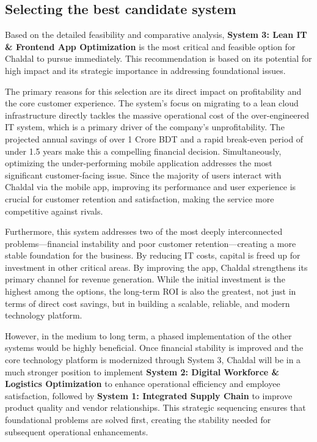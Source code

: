 \documentclass[12pt,a4paper]{article}
\begin{document}
\subsection{Selecting the best candidate system}
Based on the detailed feasibility and comparative analysis, \textbf{System 3: Lean IT \& Frontend App Optimization} is the most critical and feasible option for Chaldal to pursue immediately. This recommendation is based on its potential for high impact and its strategic importance in addressing foundational issues.

The primary reasons for this selection are its direct impact on profitability and the core customer experience. The system's focus on migrating to a lean cloud infrastructure directly tackles the massive operational cost of the over-engineered IT system, which is a primary driver of the company's unprofitability. The projected annual savings of over 1 Crore BDT and a rapid break-even period of under 1.5 years make this a compelling financial decision. Simultaneously, optimizing the under-performing mobile application addresses the most significant customer-facing issue. Since the majority of users interact with Chaldal via the mobile app, improving its performance and user experience is crucial for customer retention and satisfaction, making the service more competitive against rivals.

Furthermore, this system addresses two of the most deeply interconnected problems—financial instability and poor customer retention—creating a more stable foundation for the business. By reducing IT costs, capital is freed up for investment in other critical areas. By improving the app, Chaldal strengthens its primary channel for revenue generation. While the initial investment is the highest among the options, the long-term ROI is also the greatest, not just in terms of direct cost savings, but in building a scalable, reliable, and modern technology platform.

However, in the medium to long term, a phased implementation of the other systems would be highly beneficial. Once financial stability is improved and the core technology platform is modernized through System 3, Chaldal will be in a much stronger position to implement \textbf{System 2: Digital Workforce \& Logistics Optimization} to enhance operational efficiency and employee satisfaction, followed by \textbf{System 1: Integrated Supply Chain} to improve product quality and vendor relationships. This strategic sequencing ensures that foundational problems are solved first, creating the stability needed for subsequent operational enhancements.
\end{document}
